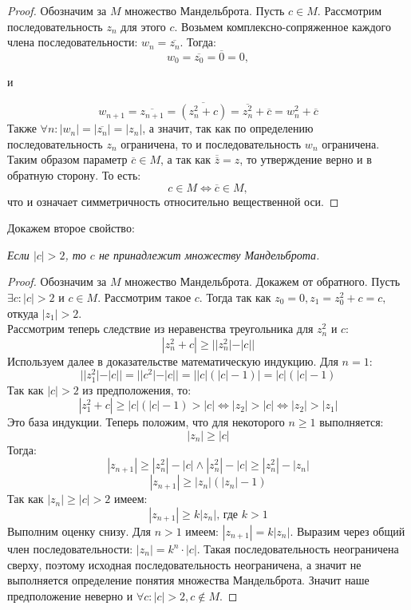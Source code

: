 \begin{proof}
    \noindent Обозначим за $M$ множество Мандельброта. Пусть $c \in M$. Рассмотрим последовательность $z_n$ для этого $c$. Возьмем комплексно-сопряженное каждого члена последовательности: $w_n= \overline{z_n}$. Тогда:
    \[
        w_0=\overline{z_0}=\overline{0}=0,
    \]
    \begin{center}
        и
    \end{center}
    \[
        w_{n+1}=\overline{z_{n+1}}=\overline{(z_n^2+c)}=\overline{z_n^2}+\overline{c}=w_n^2+\overline{c}
    \]
    Также $\forall n:|w_n|=|\overline{z_n}|=|z_n|$, а значит, так как по определению последовательность $z_n$ ограничена, то и последовательность $w_n$ ограничена. Таким образом параметр $\overline{c} \in M$, а так как $\overline{\overline{z}}=z$, то утверждение верно и в обратную сторону. То есть:
    \[
        c \in M \Longleftrightarrow \overline{c} \in M,
    \]
    что и означает симметричность относительно вещественной оси.
\end{proof}
\noindent Докажем второе свойство:
\begin{property}
    \textit{Если $|c| > 2$, то $c$ не принадлежит множеству Мандельброта.}
\end{property}
\begin{proof}
    Обозначим за $M$ множество Мандельброта. Докажем от обратного. Пусть $\exists c: |c| > 2$ и $c \in M$. Рассмотрим такое $c$. Тогда так как $z_0=0, z_1=z_0^2+c=c,$ откуда $|z_1|>2$. \\
    Рассмотрим теперь следствие из неравенства треугольника для $z_n^2$ и $c$:
    \[
        |z_n^2 + c| \geq ||z_n^2| - |c||
    \]
    Используем далее в доказательстве математическую индукцию. Для $n = 1$:
    \[
        ||z_1^2| - |c|| = ||c^2| - |c|| = ||c|(|c| - 1)| = |c|(|c| - 1)
    \]
    Так как $|c| > 2$ из предположения, то:
    \[
        |z_1^2 + c| \geq |c|(|c| - 1) > |c|
        \Longleftrightarrow |z_2|>|c|
        \Longleftrightarrow |z_2|>|z_1|
    \]
    Это база индукции. Теперь положим, что для некоторого $n \geq 1$ выполняется:
    \[
        |z_{n}| \geq |c|
    \]
    Тогда:
    \[
        |z_{n+1}| \geq |z_n^2| -|c| \land |z_n^2| -|c| \geq |z_n^2|-|z_n| 
    \]
    \[
        |z_{n+1}| \geq |z_n|(|z_n| - 1)
    \]
    Так как $|z_n| \geq |c| > 2$ имеем:
    \[
        |z_{n+1}| \geq k|z_n| \text{, где $k > 1$}
    \]
    Выполним оценку снизу. Для \( n > 1 \) имеем: $|z_{n+1}| = k|z_n|$. Выразим через общий член последовательности: $|z_n|=k^n \cdot |c|$. Такая последовательность неограничена сверху, поэтому исходная последовательность неограничена, а значит не выполняется определение понятия множества Мандельброта. Значит наше предположение неверно и ${\forall c:|c|>2, c \not\in M}$.
\end{proof}

